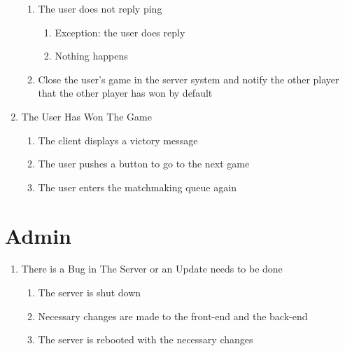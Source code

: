 \documentclass[11pt]{article}
\begin{document}
\begin{enumerate}
\begin{enumerate}
\item The user does not reply ping
\begin{enumerate}
\item Exception: the user does reply
\item Nothing happens
\end{enumerate}
\item Close the user's game in the server system and notify the other player that the other 
player has won by default
\end{enumerate}
\item The User Has Won The Game
\begin{enumerate}
\item The client displays a victory message
\item The user pushes a button to go to the next game
\item The user enters the matchmaking queue again
\end{enumerate}
\end{enumerate}
\section{Admin}
\label{sec:orgd7ad0c6}
\begin{enumerate}
\item There is a Bug in The Server or an Update needs to be done
\begin{enumerate}
\item The server is shut down
\item Necessary changes are made to the front-end and the back-end
\item The server is rebooted with the necessary changes
\end{enumerate}
\end{enumerate}
\end{document}
